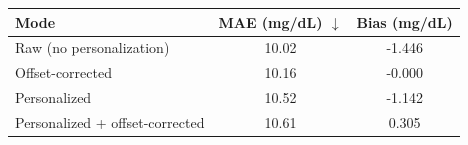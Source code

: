 \begin{tabular}{lcc}
\toprule
Mode & MAE (mg/dL) $\downarrow$ & Bias (mg/dL) \\
\midrule
Raw (no personalization) & 10.02 & -1.446 \\
Offset-corrected & 10.16 & -0.000 \\
Personalized & 10.52 & -1.142 \\
Personalized + offset-corrected & 10.61 & 0.305 \\
\bottomrule
\end{tabular}
